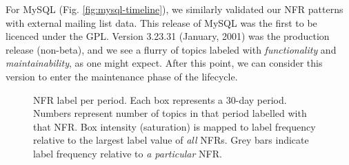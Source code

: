 \documentclass[]{sig-alternate}
\begin{document}
For MySQL (Fig. \ref{fig:mysql-timeline}), we similarly validated our NFR patterns with external mailing list data. This release of MySQL was the first to be licenced under the GPL. Version 3.23.31 (January, 2001) was the production release (non-beta), and we see a flurry of topics labeled with \emph{functionality} and \emph{maintainability}, as one might expect. After this point, we can consider this version to enter the maintenance phase of the lifecycle.




\begin{figure}[ht]
\centering
{}           
                                             
\caption[]{NFR label per period. Each box represents a 30-day period. Numbers represent number of topics in that period labelled with that NFR. Box intensity (saturation) is mapped to label frequency relative to the largest label value of \emph{all} NFRs. Grey bars indicate label frequency relative to \emph{a particular} NFR.
}
\label{fig:timelines}
\end{figure}
\end{document}
